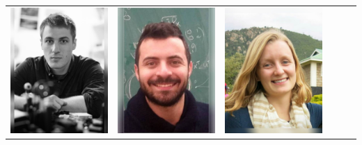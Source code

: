 \documentclass[landscape,a0paper,fontscale=0.292]{baposter}
\begin{document}
\begin{poster}
{\begin{center}
\begin{tabularx}{\linewidth}{X X X X X X}
{\centering \includegraphics[width=0.6\linewidth]{tristan.jpg}}&
{\centering \includegraphics[width=0.6\linewidth]{valerio.jpg}}&
{\centering \includegraphics[width=0.6\linewidth]{vdean.jpg}}&

\end{tabularx}
\end{center}}
\end{poster}
\end{document}
